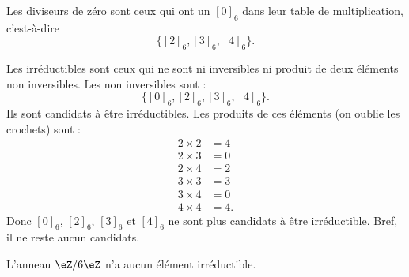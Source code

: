 \begin{normaltext}
    Les diviseurs de zéro sont ceux qui ont un \( [0]_6\) dans leur table de multiplication, c'est-à-dire
    \begin{equation}
        \big\{ [2]_6,[3]_6,[4]_6 \big\}.
    \end{equation}
\end{normaltext}

\begin{normaltext}[Irréductibles]
    Les irréductibles sont ceux qui ne sont ni inversibles ni produit de deux éléments non inversibles. Les non inversibles sont :
    \begin{equation}
        \big\{ [0]_6,[2]_6,[3]_6,[4]_6 \}.
    \end{equation}
    Ils sont candidats à être irréductibles. Les produits de ces éléments (on oublie les crochets) sont :
    \begin{subequations}
        \begin{align}
            2\times 2&=4\\
            2\times 3&=0\\
            2\times 4&=2\\
            3\times 3&=3\\
            3\times 4&=0\\
            4\times 4&=4.
        \end{align}
    \end{subequations}
    Donc \( [0]_6\), \( [2]_6\), \( [3]_6\) et \( [4]_6\) ne sont plus candidats à être irréductible. Bref, il ne reste aucun candidats.

    L'anneau \( \eZ/6\eZ\) n'a aucun élément irréductible.
\end{normaltext}

